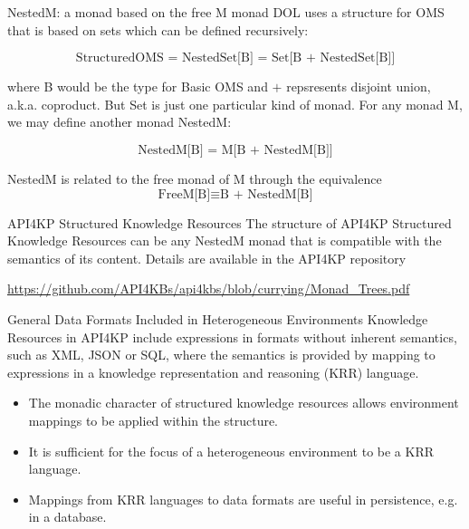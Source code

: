 \documentclass{beamer}
\begin{document}
\begin{frame}{NestedM: a monad based on the free  M monad}
  DOL uses a structure for OMS that is based on sets which can be defined recursively:
  
  $$\mbox{StructuredOMS = NestedSet[B] = Set[B + NestedSet[B]]}$$
  
  where B would be the type for Basic OMS and 
$+$ repsresents disjoint union, a.k.a. coproduct.
  But Set is just one particular kind of monad. 
  For any monad M, we may define another monad NestedM:
  
  $$\mbox{NestedM[B] = M[B + NestedM[B]]}$$

NestedM is related to the free monad of M through the equivalence
$$ \mbox{FreeM[B]} \equiv \mbox{B + NestedM[B]} $$

\end{frame}
\begin{frame}{API4KP Structured Knowledge Resources}
  The structure of API4KP Structured Knowledge Resources can be any NestedM monad that is compatible with the semantics
  of its content.
  Details are available in the API4KP repository
  
  \footnotesize{\url{https://github.com/API4KBs/api4kbs/blob/currying/Monad_Trees.pdf}}
  
\end{frame}

\begin{frame}{General Data Formats Included in Heterogeneous Environments}
Knowledge Resources in API4KP include expressions in formats without inherent semantics, such as XML, JSON or SQL, where the semantics is provided by mapping to expressions in a knowledge representation and reasoning (KRR) language.
  \begin{itemize}
  \item {The monadic character of structured knowledge resources allows environment mappings to be applied within the structure.
  }
  \item {It is sufficient for the focus of a heterogeneous environment to be a KRR language.
  }
  \item Mappings from KRR languages to data formats are useful in persistence, e.g. in a database.
  \end{itemize}
\end{frame}



\end{document}
